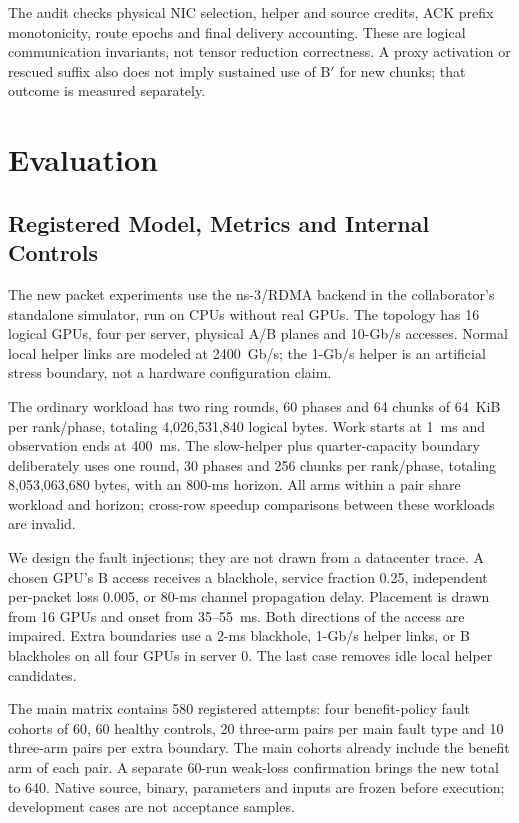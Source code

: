 \documentclass[sigconf]{acmart}
\begin{document}
The audit checks physical NIC selection, helper and source credits, ACK
prefix monotonicity, route epochs and final delivery accounting. These are
logical communication invariants, not tensor reduction correctness. A proxy
activation or rescued suffix also does not imply sustained use of B$'$ for
new chunks; that outcome is measured separately.

\section{Evaluation}
\subsection{Registered Model, Metrics and Internal Controls}
The new packet experiments use the ns-3/RDMA backend in the collaborator's
standalone simulator, run on CPUs without real GPUs. The topology has 16
logical GPUs, four per server, physical A/B planes and 10-Gb/s accesses.
Normal local helper links are modeled at 2400~Gb/s; the 1-Gb/s helper is an
artificial stress boundary, not a hardware configuration claim.

The ordinary workload has two ring rounds, 60 phases and 64 chunks of
64~KiB per rank/phase, totaling 4,026,531,840 logical bytes. Work starts at
1~ms and observation ends at 400~ms. The slow-helper plus quarter-capacity
boundary deliberately uses one round, 30 phases and 256 chunks per
rank/phase, totaling 8,053,063,680 bytes, with an 800-ms horizon. All arms
within a pair share workload and horizon; cross-row speedup comparisons
between these workloads are invalid.

We design the fault injections; they are not drawn from a datacenter trace.
A chosen GPU's B access receives a blackhole, service fraction 0.25,
independent per-packet loss 0.005, or 80-ms channel propagation delay.
Placement is drawn from 16 GPUs and onset from 35--55~ms. Both directions
of the access are impaired. Extra boundaries use a 2-ms blackhole, 1-Gb/s
helper links, or B blackholes on all four GPUs in server 0. The last case
removes idle local helper candidates.

The main matrix contains 580 registered attempts: four benefit-policy fault
cohorts of 60, 60 healthy controls, 20 three-arm pairs per main fault type
and 10 three-arm pairs per extra boundary. The main cohorts already include
the benefit arm of each pair. A separate 60-run weak-loss confirmation
brings the new total to 640. Native source, binary, parameters and inputs
are frozen before execution; development cases are not acceptance samples.
\end{document}
